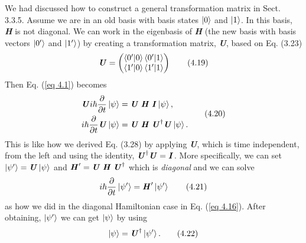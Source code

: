 \documentclass{article}
\begin{document}
We had discussed how to construct a general transformation matrix in Sect. 3.3.5.
Assume we are in an old basis with basis states $\ket{0}$ and $\ket{1}$.
In this basis, \textit{\textbf{H}} is not diagonal. We can work in the eigenbasis
of \textit{\textbf{H}} (the new basis with basis vectors $\ket{0^\prime}$ and $\ket{1^\prime}$) by
creating a transformation matrix, \textit{\textbf{U}}, based on Eq. (3.23)
\begin{equation} \label{eq 4.19}
    \textbf{\textit{U}}=\begin{pmatrix}
        \braket{0^\prime|0} \braket{0^\prime|1}\\
        \braket{1^\prime|0} \braket{1^\prime|1}
    \end{pmatrix} \tag{4.19}
\end{equation}
Then Eq. (\ref{eq 4.1}) becomes
\begin{align}
    \begin{split} \label{eq 4.20}
        \textbf{\textit{U}}i\hbar\frac{\partial}{\partial t}\ket{\psi}&=\textbf{\textit{U  H  I}}\ket{\psi},\\
        i\hbar\frac{\partial}{\partial t}\textbf{\textit{U}}\ket{\psi}&=\textbf{\textit{U  H  U}}^\dagger\textbf{\textit{U}} \ket{\psi}.
    \end{split} \tag{4.20}
\end{align}
This is like how we derived Eq. (3.28) by applying \textbf{\textit{U}}, which
is time independent, from the left and using the identity, $\textbf{\textit{U}}^\dagger\textbf{\textit{U}}= \textbf{\textit{I}}$.
More specifically, we can set $\ket{\psi^\prime}=\textbf{\textit{U}}\ket{\psi}$ and $\textbf{\textit{H}}^\prime=\textbf{\textit{U H U}}^\dagger$ 
which is \textit{diagonal} and we can solve
\begin{equation} \label{eq 4.21}
    i\hbar\frac{\partial}{\partial t}\ket{\psi^\prime}=\textbf{\textit{H}}^\prime\ket{\psi^{\prime}}\tag{4.21}
\end{equation}
as how we did in the diagonal Hamiltonian case in Eq. (\ref{eq 4.16}). After obtaining,
$\ket{\psi^\prime}$ we can get $\ket{\psi}$ by using
\begin{equation} \label{eq 4.22}
    \ket{\psi}=\textbf{\textit{U}}^\dagger\ket{\psi^\prime}. \tag{4.22}
\end{equation}
\end{document}
